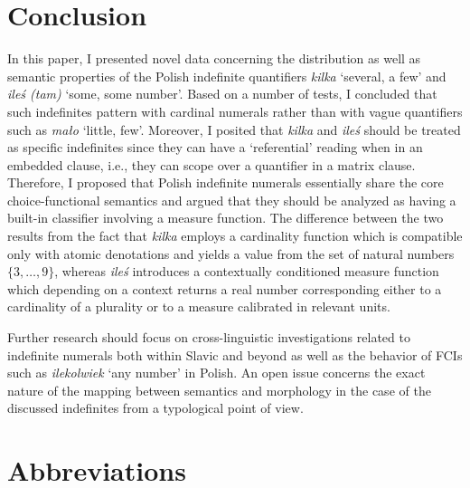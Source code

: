 \documentclass[output=paper,
]{langscibook}
\begin{document}
	\section{Conclusion}\label{sec:conclusion}
	   
	In this paper, I presented novel data concerning the distribution as well as semantic properties of the Polish indefinite quantifiers \textit{kilka} `several, a few' and \textit{ileś (tam)} `some, some number'. Based on a number of tests, I concluded that such indefinites pattern with cardinal numerals rather than with vague quantifiers such as \textit{mało} `little, few'. Moreover, I posited that \textit{kilka} and \textit{ileś} should be treated as specific indefinites since they can have a `referential' reading when in an embedded clause, i.e., they can scope over a quantifier in a matrix clause. Therefore, I proposed that Polish indefinite numerals essentially share the core choice-functional semantics and argued that they should be analyzed as having a built-in classifier involving a measure function. The difference between the two results from the fact that \textit{kilka} employs a cardinality function which is compatible only with atomic denotations and yields a value from the set of natural numbers $\{3,\dots,9\}$, whereas \textit{ileś} introduces a contextually conditioned measure function which depending on a context returns a real number corresponding either to a cardinality of a plurality or to a measure calibrated in relevant units.
    
	Further research should focus on cross-linguistic investigations related to indefinite numerals both within Slavic and beyond as well as the behavior of FCIs such as \textit{ilekolwiek} `any number' in Polish. An open issue concerns the exact nature of the mapping between semantics and morphology in the case of the discussed indefinites from a typological point of view.
	
	\section*{Abbreviations}
	
\end{document}

